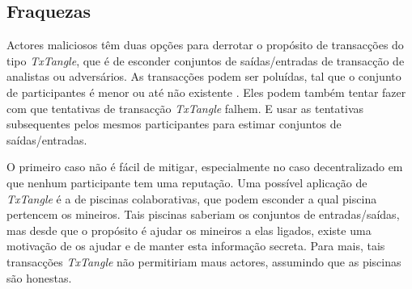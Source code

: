 

\subsection{Fraquezas}
\label{subsec:weaknesses-txtangle}

Actores maliciosos têm duas opções para derrotar o propósito de transacções do tipo {\em TxTangle}, que é de esconder conjuntos de saídas/entradas de transacção de analistas ou adversários. As transacções podem ser poluídas, tal que o conjunto de participantes é menor ou até não existente \cite{coinjoin-pollution}. Eles podem também tentar fazer com que tentativas de transacção {\em TxTangle} falhem. E usar as tentativas subsequentes pelos mesmos participantes para estimar conjuntos de saídas/entradas.
  

O primeiro caso não é fácil de mitigar, especialmente no caso decentralizado em que nenhum participante tem uma reputação. Uma possível aplicação de {\em TxTangle} é a de piscinas colaborativas, que podem esconder a qual piscina pertencem os mineiros. Tais piscinas saberiam os conjuntos de entradas/saídas, mas desde que o propósito é ajudar os mineiros a elas ligados, existe uma motivação de os ajudar e de manter esta informação secreta. Para mais, tais transacções {\em TxTangle} não permitiriam maus actores, assumindo que as piscinas são honestas.
  
